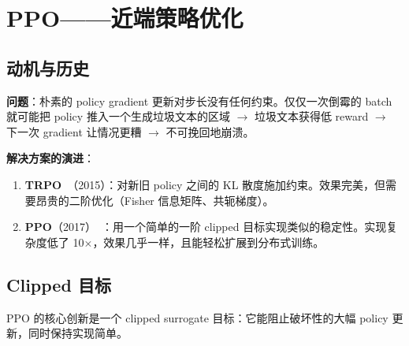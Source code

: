 \chapter{PPO——近端策略优化}
\label{ppo-proximal-policy-optimization}

\section{动机与历史}
\label{motivation-and-history}

\textbf{问题}：朴素的 policy gradient 更新对步长没有任何约束。仅仅一次倒霉的 batch 就可能把 policy 推入一个生成垃圾文本的区域 $\rightarrow$ 垃圾文本获得低 reward $\rightarrow$ 下一次 gradient 让情况更糟 $\rightarrow$ 不可挽回地崩溃。

\textbf{解决方案的演进}：

\begin{enumerate}
  \item \textbf{TRPO}~\cite{schulman2015trust}（2015）：对新旧 policy 之间的 KL 散度施加约束。效果完美，但需要昂贵的二阶优化（Fisher 信息矩阵、共轭梯度）。
  \item \textbf{PPO}（2017）~\cite{schulman2017proximal}：用一个简单的一阶 clipped 目标实现类似的稳定性。实现复杂度低了 10$\times$，效果几乎一样，且能轻松扩展到分布式训练。
\end{enumerate}

\section{Clipped 目标}
\label{the-clipped-objective}

PPO 的核心创新是一个 clipped surrogate 目标：它能阻止破坏性的大幅 policy 更新，同时保持实现简单。

